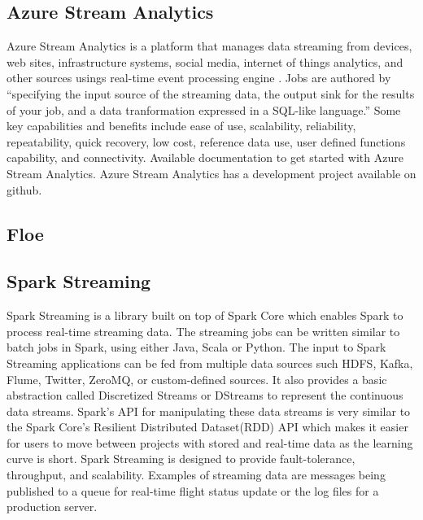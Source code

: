 \subsection{Azure Stream Analytics}

     Azure Stream Analytics is a platform that manages data streaming
     from devices, web sites, infrastructure systems, social media,
     internet of things analytics, and other sources usings real-time
     event processing engine \cite{www-azurestreamanalytics}. Jobs
     are authored by ``specifying the input source of the streaming
     data, the output sink for the results of your job, and a data
     tranformation expressed in a SQL-like language.''  Some key
     capabilities and benefits include ease of use, scalability,
     reliability, repeatability, quick recovery, low cost, reference
     data use, user defined functions capability, and
     connectivity. \cite{www-docs-microsoft} Available documentation
     to get started with Azure Stream
     Analytics. \cite{www-github-azure} Azure Stream Analytics has a
     development project available on github.

     
\subsection{Floe}
\subsection{Spark Streaming \cite{www-apache-spark-stream}}

     Spark Streaming is a library built on top of Spark Core which
     enables Spark to process real-time streaming data. The streaming
     jobs can be written similar to batch jobs in Spark, using either
     Java, Scala or Python. The input to Spark Streaming applications
     can be fed from multiple data sources such HDFS, Kafka, Flume,
     Twitter, ZeroMQ, or custom-defined sources. It also provides a
     basic abstraction called Discretized Streams or DStreams to
     represent the continuous data streams. Spark's API for
     manipulating these data streams is very similar to the Spark
     Core’s Resilient Distributed Dataset(RDD) API
     \cite{www-apache-spark-RDD} which makes it easier for users to
     move between projects with stored and real-time data as the
     learning curve is short.  Spark Streaming is designed to provide
     fault-tolerance, throughput, and scalability. Examples of
     streaming data are messages being published to a queue for
     real-time flight status update or the log files for a production
     server.
     
